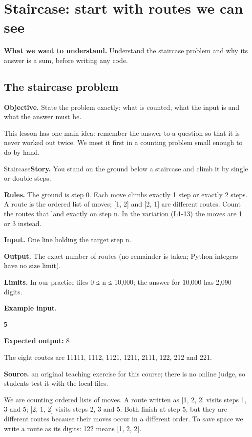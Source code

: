 \documentclass[11pt,a4paper,oneside]{report}
\newcommand{\classref}[1]{\marginpar{\raggedright\fontsize{9}{12}\selectfont\color{quiet}\colorbox{wash}{\heavy\fontsize{8}{10}\selectfont IN THE CLASSROOM}\par\smallskip#1}}
\newcommand{\readinggoal}[1]{\par\textbf{What we want to understand.} #1\par\smallskip}
\newcommand{\sectiongoal}[1]{\par{\color{quiet}\textbf{Objective.} #1}\par\smallskip}
\begin{document}
\chapter{Staircase: start with routes we can see}
\readinggoal{Understand the staircase problem and why its answer is a sum, before writing any code.}
\section{The staircase problem}
\classref{L1-05}
\sectiongoal{State the problem exactly: what is counted, what the input is and what the answer must be.}
This lesson has one main idea: remember the answer to a question so that it is never worked out twice. We meet it first in a counting problem small enough to do by hand.

\begin{problembox}{Staircase}\textbf{Story.} You stand on the ground below a staircase and climb it by single or double steps.\par\smallskip \textbf{Rules.} The ground is step 0. Each move climbs exactly 1 step or exactly 2 steps. A route is the ordered list of moves; [1, 2] and [2, 1] are different routes. Count the routes that land exactly on step n. In the variation (L1-13) the moves are 1 or 3 instead.\par\smallskip \textbf{Input.} One line holding the target step n.\par\smallskip \textbf{Output.} The exact number of routes (no remainder is taken; Python integers have no size limit).\par\smallskip \textbf{Limits.} In our practice files 0 ≤ n ≤ 10,000; the answer for 10,000 has 2,090 digits.\par\smallskip \textbf{Example input.}
\begin{lstlisting}[language={},aboveskip=2pt,belowskip=2pt]
5
\end{lstlisting}
\textbf{Expected output:} 8\par\smallskip The eight routes are 11111, 1112, 1121, 1211, 2111, 122, 212 and 221.\par\smallskip\textbf{Source.} an original teaching exercise for this course; there is no online judge, so students test it with the local files.\end{problembox}
We are counting ordered lists of moves. A route written as [1, 2, 2] visits steps 1, 3 and 5; [2, 1, 2] visits steps 2, 3 and 5. Both finish at step 5, but they are different routes because their moves occur in a different order. To save space we write a route as its digits: 122 means [1, 2, 2].
\end{document}
